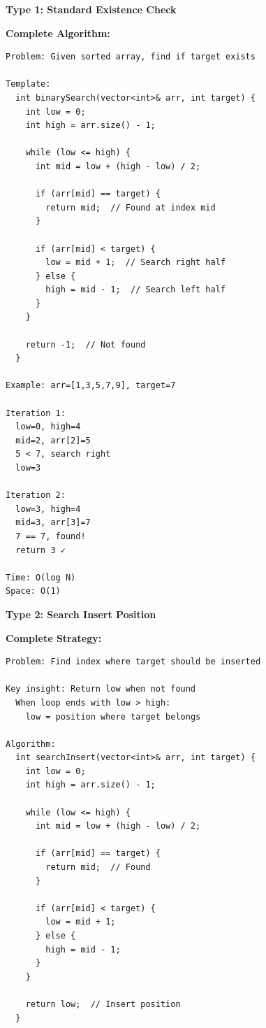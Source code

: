 \documentclass[11pt,a4paper,oneside]{book}
\begin{document}
\begin{tcolorbox}[
    enhanced,breakable,
    colback=successgreen!10,
    colframe=successgreen,
    boxrule=1.5pt,
    arc=3mm,
    title=\textbf{Complete Basic Binary Search}
]
\textbf{Type 1: Standard Existence Check}

\textbf{Complete Algorithm:}
\begin{verbatim}
Problem: Given sorted array, find if target exists

Template:
  int binarySearch(vector<int>& arr, int target) {
    int low = 0;
    int high = arr.size() - 1;
    
    while (low <= high) {
      int mid = low + (high - low) / 2;
      
      if (arr[mid] == target) {
        return mid;  // Found at index mid
      }
      
      if (arr[mid] < target) {
        low = mid + 1;  // Search right half
      } else {
        high = mid - 1;  // Search left half
      }
    }
    
    return -1;  // Not found
  }

Example: arr=[1,3,5,7,9], target=7

Iteration 1:
  low=0, high=4
  mid=2, arr[2]=5
  5 < 7, search right
  low=3

Iteration 2:
  low=3, high=4
  mid=3, arr[3]=7
  7 == 7, found!
  return 3 ✓

Time: O(log N)
Space: O(1)
\end{verbatim}

\textbf{Type 2: Search Insert Position}

\textbf{Complete Strategy:}
\begin{verbatim}
Problem: Find index where target should be inserted

Key insight: Return low when not found
  When loop ends with low > high:
    low = position where target belongs

Algorithm:
  int searchInsert(vector<int>& arr, int target) {
    int low = 0;
    int high = arr.size() - 1;
    
    while (low <= high) {
      int mid = low + (high - low) / 2;
      
      if (arr[mid] == target) {
        return mid;  // Found
      }
      
      if (arr[mid] < target) {
        low = mid + 1;
      } else {
        high = mid - 1;
      }
    }
    
    return low;  // Insert position
  }


\end{verbatim}
\end{tcolorbox}
\end{document}
